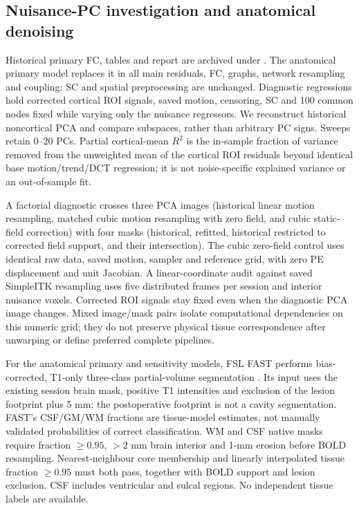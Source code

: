 \documentclass[11pt,a4paper]{article}
\begin{document}
\subsection{Nuisance-PC investigation and anatomical denoising}
Historical primary FC, tables and report are archived under . The anatomical primary model replaces it in all main residuals, FC, graphs, network resampling and coupling; SC and spatial preprocessing are unchanged. Diagnostic regressions hold corrected cortical ROI signals, saved motion, censoring, SC and 100 common nodes fixed while varying only the nuisance regressors. We reconstruct historical noncortical PCA and compare subspaces, rather than arbitrary PC signs. Sweeps retain 0--20 PCs. Partial cortical-mean $R^2$ is the in-sample fraction of variance removed from the unweighted mean of the cortical ROI residuals beyond identical base motion/trend/DCT regression; it is not noise-specific explained variance or an out-of-sample fit.

A factorial diagnostic crosses three PCA images (historical linear motion resampling, matched cubic motion resampling with zero field, and cubic static-field correction) with four masks (historical, refitted, historical restricted to corrected field support, and their intersection). The cubic zero-field control uses identical raw data, saved motion, sampler and reference grid, with zero PE displacement and unit Jacobian. A linear-coordinate audit against saved SimpleITK resampling uses five distributed frames per session and interior nuisance voxels. Corrected ROI signals stay fixed even when the diagnostic PCA image changes. Mixed image/mask pairs isolate computational dependencies on this numeric grid; they do not preserve physical tissue correspondence after unwarping or define preferred complete pipelines.

For the anatomical primary and sensitivity models, FSL FAST performs bias-corrected, T1-only three-class partial-volume segmentation \citep{zhang2001,fastdocs}. Its input uses the existing session brain mask, positive T1 intensities and exclusion of the lesion footprint plus 5 mm; the postoperative footprint is not a cavity segmentation. FAST's CSF/GM/WM fractions are tissue-model estimates, not manually validated probabilities of correct classification. WM and CSF native masks require fraction $\geq0.95$, $>2$ mm brain interior and 1-mm erosion before BOLD resampling. Nearest-neighbour core membership and linearly interpolated tissue fraction $\geq0.95$ must both pass, together with BOLD support and lesion exclusion. CSF includes ventricular and sulcal regions. No independent tissue labels are available.
\end{document}
